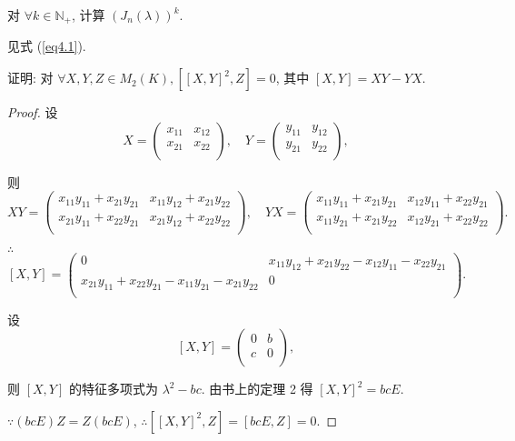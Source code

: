 \documentclass[color=black,device=normal,lang=cn,mode=geye]{elegantnote}
\begin{document}
\begin{exercise}%
    对 $\forall k\in\mathbb{N}_+$, 计算 $(J_n(\lambda))^k$.
\end{exercise}
\begin{solution}
    见式 (\ref{eq4.1}).
\end{solution}
\begin{exercise}%
    证明: 对 $\forall X,Y,Z\in M_2(K),[[X,Y]^2,Z]=0$, 其中 $[X,Y]=XY-YX$.
\end{exercise}
\begin{proof}
    设
    \[X=\begin{pmatrix}
        x_{11} & x_{12} \\
        x_{21} & x_{22} \\
    \end{pmatrix},\quad Y=\begin{pmatrix}
        y_{11} & y_{12} \\
        y_{21} & y_{22} \\
    \end{pmatrix},\]

    则
    \[XY=\begin{pmatrix}
        x_{11}y_{11}+x_{21}y_{21} & x_{11}y_{12}+x_{21}y_{22} \\
        x_{21}y_{11}+x_{22}y_{21} & x_{21}y_{12}+x_{22}y_{22} \\
    \end{pmatrix},\quad YX=\begin{pmatrix}
        x_{11}y_{11}+x_{21}y_{21} & x_{12}y_{11}+x_{22}y_{21} \\
        x_{11}y_{21}+x_{21}y_{22} & x_{12}y_{21}+x_{22}y_{22} \\
    \end{pmatrix}.\]

    $\therefore$
    \[[X,Y]=\begin{pmatrix}
        0 & x_{11}y_{12}+x_{21}y_{22}-x_{12}y_{11}-x_{22}y_{21} \\
        x_{21}y_{11}+x_{22}y_{21}-x_{11}y_{21}-x_{21}y_{22} & 0 \\
    \end{pmatrix}.\]

    设
    \[[X,Y]=\begin{pmatrix}
        0 & b \\
        c & 0 \\
    \end{pmatrix},\]

    则 $[X,Y]$ 的特征多项式为 $\lambda^2-bc$. 由书上的定理 2 得 $[X,Y]^2=bcE$.

    $\because (bcE)Z=Z(bcE)$, $\therefore[[X,Y]^2,Z]=[bcE,Z]=0$.
\end{proof}
\end{document}

